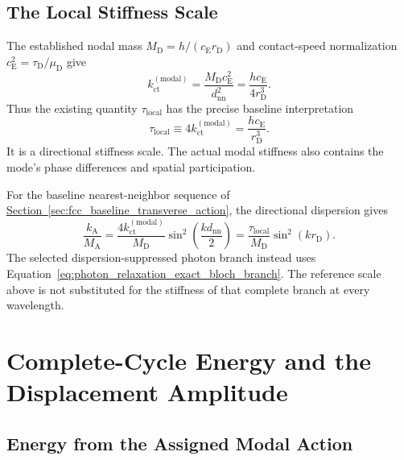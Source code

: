 \subsection{The Local Stiffness Scale}

The established nodal mass $M_{\mathrm D}=h/(c_{\mathrm E}r_{\mathrm D})$ and contact-speed normalization $c_{\mathrm E}^{2}=\tau_{\mathrm D}/\mu_{\mathrm D}$ give
\begin{equation}
    k_{\mathrm{ct}}^{(\mathrm{modal})}
    =\frac{M_{\mathrm D}c_{\mathrm E}^{2}}{d_{\mathrm{nn}}^{2}}
    =\frac{hc_{\mathrm E}}{4r_{\mathrm D}^{3}}.
\end{equation}
Thus the existing quantity $\tau_{\mathrm{local}}$ has the precise baseline interpretation
\begin{equation}
    \boxed{
    \tau_{\mathrm{local}}
    \equiv4k_{\mathrm{ct}}^{(\mathrm{modal})}
    =\frac{hc_{\mathrm E}}{r_{\mathrm D}^{3}}
    }.
\end{equation}
It is a directional stiffness scale. The actual modal stiffness also contains the mode's phase differences and spatial participation.

For the baseline nearest-neighbor sequence of \hyperref[sec:fcc_baseline_transverse_action]{Section~\ref*{sec:fcc_baseline_transverse_action}}, the directional dispersion gives
\begin{equation}
    \frac{k_{\mathrm A}}{M_{\mathrm A}}
    =\frac{4k_{\mathrm{ct}}^{(\mathrm{modal})}}{M_{\mathrm D}}
    \sin^{2}\!\left(\frac{kd_{\mathrm{nn}}}{2}\right)
    =\frac{\tau_{\mathrm{local}}}{M_{\mathrm D}}
    \sin^{2}(kr_{\mathrm D}).
\end{equation}
The selected dispersion-suppressed photon branch instead uses Equation~\eqref{eq:photon_relaxation_exact_bloch_branch}. The reference scale above is not substituted for the stiffness of that complete branch at every wavelength.

\section{Complete-Cycle Energy and the Displacement Amplitude}

\subsection{Energy from the Assigned Modal Action}

